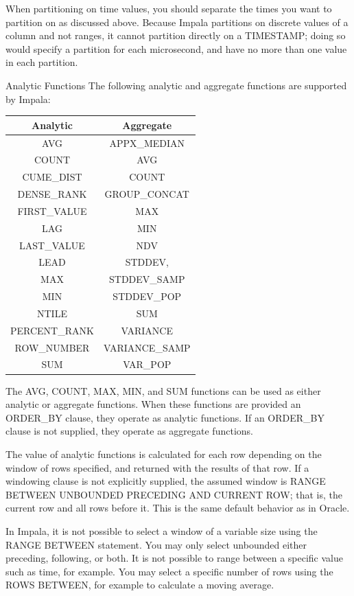 \documentclass[onecolumn, draftclsnofoot,10pt, compsoc]{IEEEtran}
\begin{document}
When partitioning on time values, you should separate the times you want to partition on as discussed above. 
Because Impala partitions on discrete values of a column and not ranges, it cannot partition directly on a TIMESTAMP; doing so would specify a partition for each microsecond, and have no more than one value in each partition.
\newline

Analytic Functions
The following analytic and aggregate functions are supported by Impala:
\begin{center}
\begin{tabular}{ |c|c| }
    \hline
    Analytic & Aggregate \\
    \hline
    AVG & APPX\_MEDIAN \\
    COUNT & AVG \\
    CUME\_DIST & COUNT \\
    DENSE\_RANK & GROUP\_CONCAT \\
    FIRST\_VALUE & MAX \\
    LAG & MIN \\
    LAST\_VALUE & NDV \\
    LEAD & STDDEV,  \\
    MAX & STDDEV\_SAMP \\
    MIN & STDDEV\_POP \\
    NTILE & SUM \\
    PERCENT\_RANK & VARIANCE \\
    ROW\_NUMBER & VARIANCE\_SAMP\\
    SUM & VAR\_POP \\
    \hline
\end{tabular}
\end{center}

The AVG, COUNT, MAX, MIN, and SUM functions can be used as either analytic or aggregate functions.
When these functions are provided an ORDER\_BY clause, they operate as analytic functions.
If an ORDER\_BY clause is not supplied, they operate as aggregate functions. 

The value of analytic functions is calculated for each row depending on the window of rows specified, and returned with the results of that row.
If a windowing clause is not explicitly supplied, the assumed window is RANGE BETWEEN UNBOUNDED PRECEDING AND CURRENT ROW; that is, the current row and all rows before it.
This is the same default behavior as in Oracle. 

In Impala, it is not possible to select a window of a variable size using the RANGE BETWEEN statement.
You may only select unbounded either preceding, following, or both.
It is not possible to range between a specific value such as time, for example. 
You may select a specific number of rows using the ROWS BETWEEN, for example to calculate a moving average.
\end{document}
